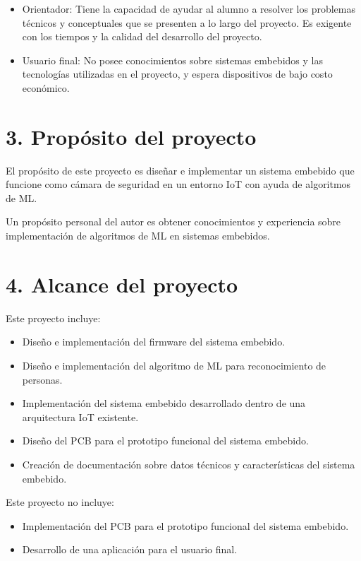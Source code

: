 \documentclass[
11pt, %
]{plan}
\begin{document}
\begin{itemize}
	\item Orientador: Tiene la capacidad de ayudar al alumno a resolver los problemas técnicos y conceptuales que se presenten a lo largo del proyecto. Es exigente con los tiempos y la calidad del desarrollo del proyecto.
	\item Usuario final: No posee conocimientos sobre sistemas embebidos y las tecnologías utilizadas en el proyecto, y espera dispositivos de bajo costo económico.
\end{itemize}



\section{3. Propósito del proyecto}
\label{sec:proposito}

El propósito de este proyecto es diseñar e implementar un sistema embebido que funcione como cámara de seguridad en un entorno IoT con ayuda de algoritmos de ML.

Un propósito personal del autor es obtener conocimientos y experiencia sobre implementación de algoritmos de ML en sistemas embebidos.

\section{4. Alcance del proyecto}
\label{sec:alcance}

Este proyecto incluye:
\begin{itemize}
	\item Diseño e implementación del firmware del sistema embebido.
	\item Diseño e implementación del algoritmo de ML para reconocimiento de personas.
	\item Implementación del sistema embebido desarrollado dentro de una arquitectura IoT existente.
	\item Diseño del PCB para el prototipo funcional del sistema embebido.
	\item Creación de documentación sobre datos técnicos y características del sistema embebido.
\end{itemize}

Este proyecto no incluye:
\begin{itemize}
	\item Implementación del PCB para el prototipo funcional del sistema embebido.
	\item Desarrollo de una aplicación para el usuario final.
\end{itemize}
\end{document}
